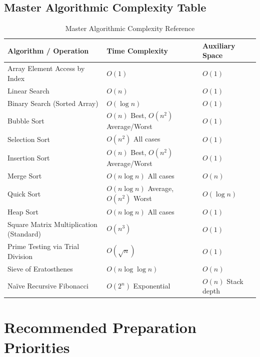 \subsection{Master Algorithmic Complexity Table}
\begin{table}[htbp]
\centering
\small
\begin{tabularx}{\textwidth}{l X l}
\toprule
\textbf{Algorithm / Operation} & \textbf{Time Complexity} & \textbf{Auxiliary Space} \\
\midrule
Array Element Access by Index & $O(1)$ & $O(1)$ \\
Linear Search & $O(n)$ & $O(1)$ \\
Binary Search (Sorted Array) & $O(\log n)$ & $O(1)$ \\
Bubble Sort & $O(n)$ Best, $O(n^2)$ Average/Worst & $O(1)$ \\
Selection Sort & $O(n^2)$ All cases & $O(1)$ \\
Insertion Sort & $O(n)$ Best, $O(n^2)$ Average/Worst & $O(1)$ \\
Merge Sort & $O(n \log n)$ All cases & $O(n)$ \\
Quick Sort & $O(n \log n)$ Average, $O(n^2)$ Worst & $O(\log n)$ \\
Heap Sort & $O(n \log n)$ All cases & $O(1)$ \\
Square Matrix Multiplication (Standard) & $O(n^3)$ & $O(1)$ \\
Prime Testing via Trial Division & $O(\sqrt{n})$ & $O(1)$ \\
Sieve of Eratosthenes & $O(n \log \log n)$ & $O(n)$ \\
Naïve Recursive Fibonacci & $O(2^n)$ Exponential & $O(n)$ Stack depth \\
\bottomrule
\end{tabularx}
\caption{Master Algorithmic Complexity Reference}
\label{tab:algorithmic_complexity_reference}
\end{table}

\section{Recommended Preparation Priorities}
\label{sec:recommended_preparation_priorities}

